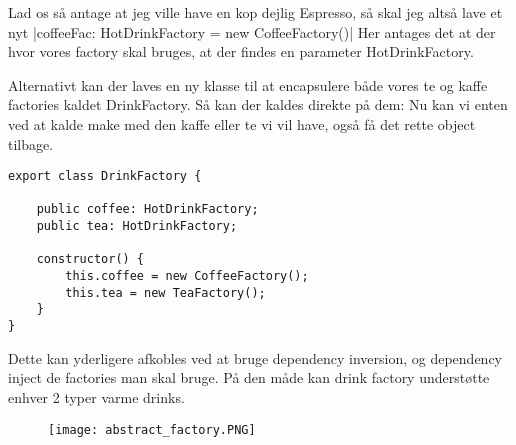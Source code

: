 \documentclass[../SWD_disp.tex]{subfiles}
\begin{document}
Lad os så antage at jeg ville have en kop dejlig Espresso, så skal jeg altså lave et nyt 
|coffeeFac: HotDrinkFactory = new CoffeeFactory()|
Her antages det at der hvor vores factory skal bruges, at der findes en parameter HotDrinkFactory. 

Alternativt kan der laves en ny klasse til at encapsulere både vores te og kaffe factories kaldet DrinkFactory. Så kan der kaldes direkte på dem: 
Nu kan vi enten ved at kalde make med den kaffe eller te vi vil have, også få det rette object tilbage.

\begin{verbatim}
export class DrinkFactory {

    public coffee: HotDrinkFactory;
    public tea: HotDrinkFactory;

    constructor() {
        this.coffee = new CoffeeFactory();
        this.tea = new TeaFactory();
    }
}
\end{verbatim}

Dette kan yderligere afkobles ved at bruge dependency inversion, og dependency inject de factories man skal bruge. På den måde kan drink factory understøtte enhver 2 typer varme drinks. 

\begin{figure}[H]
    \centering
    \texttt{[image: abstract\_factory.PNG]}
\end{figure}
\end{document}
